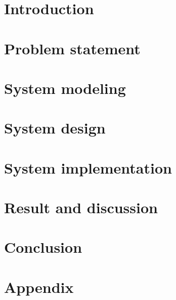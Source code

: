 \documentclass[11pt,a4paper,fleqn]{article}
\begin{document}

\newpage

\tableofcontents
\newpage


\section{Introduction}%
\label{sec:introduction}


\section{Problem statement}%
\label{sec:problem_statement}


\section{System modeling}%
\label{sec:system_modeling}


\section{System design}%
\label{sec:system_design}


\section{System implementation}%
\label{sec:system_implementation}


\section{Result and discussion}%
\label{sec:result_and_discussion}


\section{Conclusion}%
\label{sec:conclusion}



{}


\section{Appendix}%
\label{sec:appendix}

\end{document}
